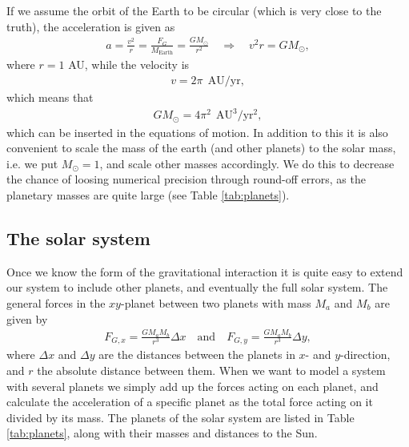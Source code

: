 \documentclass[12pt, a4paper]{article}
\begin{document}
If we assume the orbit 
of the Earth to be circular (which is very close to the truth), the acceleration is given as 
\begin{align*}
a = \frac{v^2}{r} = \frac{F_G}{M_{\text{Earth}}} = \frac{GM_{\odot}}{r^2} \quad \Rightarrow \quad 
v^2 r = GM_{\odot}, 
\end{align*}  
where $r = 1$ AU, while the velocity is 
\begin{align*}
v = 2\pi \:\: \text{AU/yr},   
\end{align*}
which means that 
\begin{align*}
GM_{\odot} = 4\pi^2 \:\: \text{AU}^3/\text{yr}^2,  
\end{align*}
which can be inserted in the equations of motion. In addition to this it is also 
convenient to scale the mass of the earth (and other planets) to the solar mass, i.e. we put 
$M_{\odot} = 1$, and scale other masses accordingly. We do this to decrease the chance of loosing 
numerical precision through round-off errors, as the planetary masses are quite large (see Table  
\ref{tab:planets}). 

\subsection{The solar system}

Once we know the form of the gravitational interaction it is quite easy to extend our system to include 
other planets, and eventually the full solar system. The general forces in the $xy$-planet  
between two planets with mass $M_a$ and $M_b$ are given by 
\begin{align*}
F_{G,x} = \frac{GM_aM_b}{r^3}\Delta x \quad \text{and} \quad F_{G,y} = \frac{GM_aM_b}{r^3}\Delta y, 
\end{align*}  
where $\Delta x$ and $\Delta y$ are the distances between the planets in $x$- and $y$-direction, and 
$r$ the absolute distance between them. When we want to model a system with several planets we simply 
add up the forces acting on each planet, and calculate the acceleration of a specific planet as 
the total force acting on it divided by its mass. The planets of the solar system are listed in Table 
\ref{tab:planets}, along with their masses and distances to the Sun.   
\end{document}
